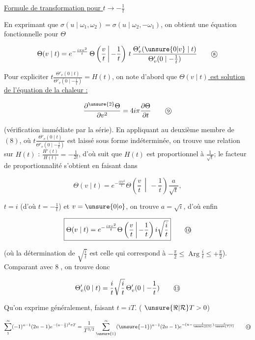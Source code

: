 \uline{Formule de transformation pour $t\to-\frac1t$}

En exprimant que $\sigma(u\mid\omega_1,\omega_2)=\sigma(u\mid\omega_2,-\omega_1)$, on obtient une équation fonctionnelle pour $\Theta$

\[
\Theta(v\mid t)=e^{-\frac{i\pi v^2}{t}}\,\Theta\left(\frac vt\,\middle|\,-\frac1t\right)\,t\,
\frac{\Theta'_v(\unsure{0|v}\mid t)}{\Theta'_v(0\mid-\frac1t)}
\tag*{\textcircled{\scriptsize 8}}
\]

Pour expliciter $t\frac{\Theta'_v(0\mid t)}{\Theta'_v(0\mid-\frac1t)}=H(t)$, on note d'abord que \uline{$\Theta(v\mid t)$ est solution de l'équation de la chaleur :}

\[
\frac{\partial^{\unsure{2}}\Theta}{\partial v^2}=4i\pi\frac{\partial\Theta}{\partial t}
\tag*{\textcircled{\scriptsize 9}}
\]

(vérification immédiate par la série). En appliquant au deuxième membre de $(8)$, où $t\frac{{\Theta}'_v(0\mid t)}{\Theta'_v(0\mid-\frac1t)}$ est laissé sous forme indéterminée, on trouve une relation sur $H(t)$ : $\frac{H'(t)}{H(t)}=-\frac1{2t}$, d'où suit que $H(t)$ est proportionnel à $\frac1{\sqrt t}$; le facteur de proportionnalité s'obtient en faisant dans

\[
\Theta(v\mid t)=e^{-\frac{i\pi v^2}{t}}\Theta\left(\frac vt\,\middle|\,-\frac1t\right)\frac a{\sqrt t},
\]

$t=i$ (d'où $t=-\frac1t$) et $v=\unsure{0|o}$, on trouve $a=\sqrt i$, d'où enfin

\[
\boxed{\Theta(v\mid t)=e^{-\frac{i\pi v^2}{t}}\Theta\left(\frac vt\,\middle|\,-\frac1t\right)i\sqrt{\frac it}}
\tag*{\textcircled{\scriptsize 10}}
\]

(où la détermination de $\sqrt{\frac it}$ est celle qui correspond à $-\frac{\pi}{2}\leq\operatorname{Arg}\frac it\leq+\frac{\pi}{2}$). Comparant avec \textcircled{\scriptsize 8}, on trouve donc

\[
\Theta'_v(0\mid t)=\frac{i}t\sqrt{\frac it}\,\Theta'_v(0\mid-\frac1t)
\tag*{\textcircled{\scriptsize 11}}
\]

Qu'on exprime généralement, faisant $t=iT$. ( $\unsure{\Re|\mathcal R}T>0$)

\[
\sum_1^\infty(-1)^{n-1}(2n-1)e^{-(n-\frac12)^2\pi T}
=\frac1{T^{3/2}}\sum_{\unsure{1}}^\infty(\unsure{-1})^{n-1}(2n-1)e^{-(n-\frac1{\unsure{2|3}})\frac{\pi}{\unsure{T|1}}}
\tag*{\textcircled{\scriptsize 12}}
\]

